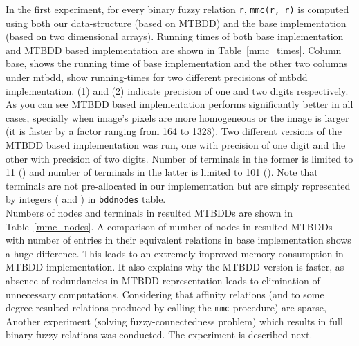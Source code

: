 \documentclass[4pt]{article}
\begin{document}
In the first experiment, for every binary fuzzy relation \verb=r=, \verb=mmc(r, r)= is computed using both our data-structure (based on MTBDD) and the base implementation (based on two dimensional arrays). Running times of both base implementation and MTBDD based implementation are shown in Table~\ref{mmc_times}. Column base, shows the running time of base implementation and the other two columns under mtbdd, show running-times for two different precisions of mtbdd implementation. (1) and (2) indicate precision of one and two digits respectively.\\
As you can see MTBDD based implementation performs significantly better in all cases, specially when image's pixels are more homogeneous or the image is larger (it is faster by a factor ranging from 164 to 1328). Two different versions of the MTBDD  based implementation was run, one with precision of one digit and the other with precision of two digits. Number of terminals in the former is limited to 11 () and number of terminals in the latter is limited to 101 (). Note that terminals are not pre-allocated in our implementation but are simply represented by integers ( and ) in \verb=bddnodes= table.\\
Numbers of nodes and terminals in resulted MTBDDs are shown in Table~\ref{mmc_nodes}. A comparison of number of nodes in resulted MTBDDs with number of entries in their equivalent relations in base implementation shows a huge difference. This leads to an extremely improved memory consumption in MTBDD implementation. It also explains why the MTBDD version is faster, as absence of redundancies in MTBDD representation leads to elimination of unnecessary computations. 
Considering that affinity relations (and to some degree resulted relations produced by calling the \verb=mmc= procedure) are sparse, Another experiment (solving fuzzy-connectedness problem) which results in full binary fuzzy relations was conducted. The experiment is described next.
\end{document}
